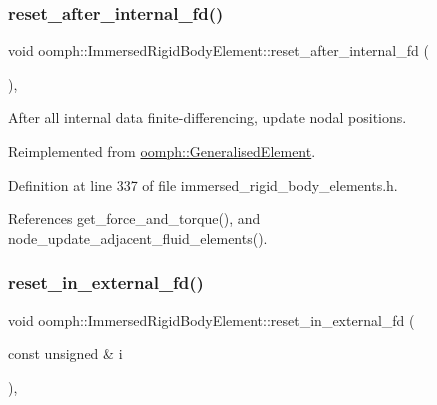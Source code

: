 \subsubsection{\texorpdfstring{reset\+\_\+after\+\_\+internal\+\_\+fd()}{reset\_after\_internal\_fd()}}
{\footnotesize\ttfamily void oomph\+::\+Immersed\+Rigid\+Body\+Element\+::reset\+\_\+after\+\_\+internal\+\_\+fd (\begin{DoxyParamCaption}{ }\end{DoxyParamCaption})\hspace{0.3cm}{\ttfamily [inline]}, {\ttfamily [virtual]}}



After all internal data finite-\/differencing, update nodal positions. 



Reimplemented from \hyperlink{classoomph_1_1GeneralisedElement_ab3e2e13d219c132488fb05e9596cb43f}{oomph\+::\+Generalised\+Element}.



Definition at line 337 of file immersed\+\_\+rigid\+\_\+body\+\_\+elements.\+h.



References get\+\_\+force\+\_\+and\+\_\+torque(), and node\+\_\+update\+\_\+adjacent\+\_\+fluid\+\_\+elements().

\mbox{\label{classoomph_1_1ImmersedRigidBodyElement_a54ca1acbe1ad39e6ff692a79062318a0}} 
\subsubsection{\texorpdfstring{reset\+\_\+in\+\_\+external\+\_\+fd()}{reset\_in\_external\_fd()}}
{\footnotesize\ttfamily void oomph\+::\+Immersed\+Rigid\+Body\+Element\+::reset\+\_\+in\+\_\+external\+\_\+fd (\begin{DoxyParamCaption}\item[{const unsigned \&}]{i }\end{DoxyParamCaption})\hspace{0.3cm}{\ttfamily [inline]}, {\ttfamily [virtual]}}




